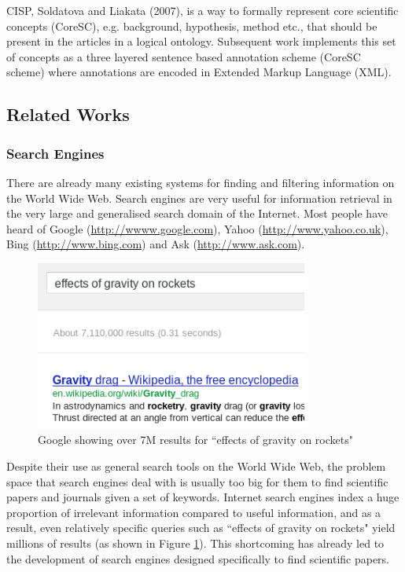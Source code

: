 \documentclass[12pt,a4paper]{article}
\begin{document}
CISP, Soldatova and Liakata (2007), is a way to formally represent core
scientific concepts (CoreSC), e.g. background, hypothesis, method etc., that
should be present in the articles in a logical
ontology\cite{soldatova2007ontology}. Subsequent work implements this set of
concepts as a three layered sentence based annotation scheme (CoreSC scheme)
where annotations are encoded in Extended Markup Language
(XML)\cite{LIAKATA10.644}.

\subsection{Related Works}
\label{sec:prior_art}

\subsubsection{Search Engines} 

There are already many existing systems for finding and filtering information
on the World Wide Web. Search engines are very useful for information retrieval
in the very large and generalised search domain of the Internet. Most people
have heard of Google (\url{http://wwww.google.com}), Yahoo
(\url{http://www.yahoo.co.uk}), Bing (\url{http://www.bing.com}) and Ask
(\url{http://www.ask.com}). 

\begin{figure}[!ht]
\includegraphics[width=0.80\textwidth]{images/space_rocket_query.png}
\caption{{Google showing over 7M results for ``effects of gravity on rockets"}}
\label{fig:rocket_results}
\end{figure}


Despite their use as general search tools on the World Wide Web, the problem
space that search engines deal with is usually too big for them to find
scientific papers and journals given a set of keywords. Internet search engines
index a huge proportion of irrelevant information compared to useful
information\cite{Berghel1997}, and as a result, even relatively specific
queries such as ``effects of gravity on rockets" yield millions of results (as
shown in Figure \ref{fig:rocket_results}). This shortcoming has already led to
the development of search engines designed specifically to find scientific
papers. 
\end{document}
